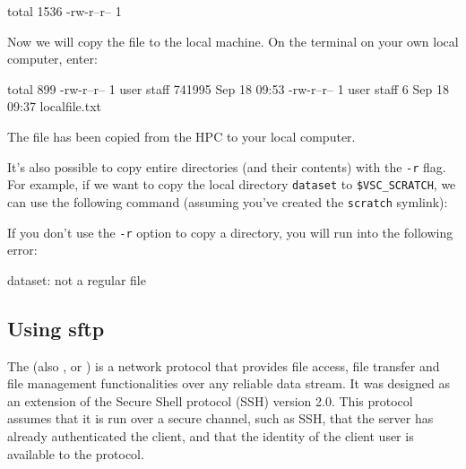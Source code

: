 \begin{prompt}
total 1536
-rw-r--r-- 1 %
\end{prompt}

  Now we will copy the file to the local machine. On the terminal on your own local computer, enter:

\begin{prompt}
total  899
-rw-r--r--   1 user  staff  741995 Sep 18 09:53 %
-rw-r--r--   1 user  staff       6 Sep 18 09:37 localfile.txt
\end{prompt}

The file has been copied from the HPC to your local computer.

It's also possible to copy entire directories (and their contents) with the \lstinline|-r| flag.
For example, if we want to copy the local directory \lstinline|dataset| to \lstinline|$VSC_SCRATCH|,
we can use the following command (assuming you've created the \lstinline|scratch| symlink):

\begin{prompt}
\end{prompt}

If you don't use the \lstinline|-r| option to copy a directory, you will run into the following error:

\begin{prompt}
dataset: not a regular file
\end{prompt}



  \subsection{Using sftp}

  The  (also , or ) is a network protocol that provides file access,
  file transfer and file management functionalities over any reliable data
  stream. It was designed as an extension of the Secure Shell protocol (SSH)
  version 2.0. This protocol assumes that it is run over a secure channel, such
  as SSH, that the server has already authenticated the client, and that the
  identity of the client user is available to the protocol.

